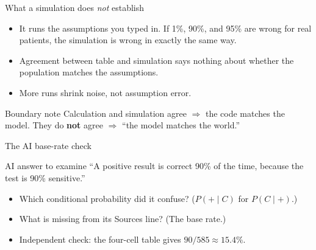 \documentclass[aspectratio=169,10pt]{beamer}
\begin{document}
\begin{frame}{What a simulation does \emph{not} establish}
\begin{itemize}
\item It runs the assumptions you typed in. If 1\%, 90\%, and 95\% are wrong for real patients, the simulation is wrong in exactly the same way.
\item Agreement between table and simulation says nothing about whether the population matches the assumptions.
\item More runs shrink noise, not assumption error.
\end{itemize}
\vspace{2mm}
\begin{block}{Boundary note}
Calculation and simulation agree $\Rightarrow$ the code matches the model. They do \textbf{not} agree $\Rightarrow$ ``the model matches the world.''
\end{block}
\end{frame}

\begin{frame}{The AI base-rate check}
\begin{block}{AI answer to examine}
``A positive result is correct 90\% of the time, because the test is 90\% sensitive.''
\end{block}
\begin{itemize}
\item Which conditional probability did it confuse? ($P(+\mid C)$ for $P(C\mid +)$.)
\item What is missing from its Sources line? (The base rate.)
\item Independent check: the four-cell table gives $90/585\approx 15.4\%$.
\end{itemize}
\end{frame}
\end{document}
